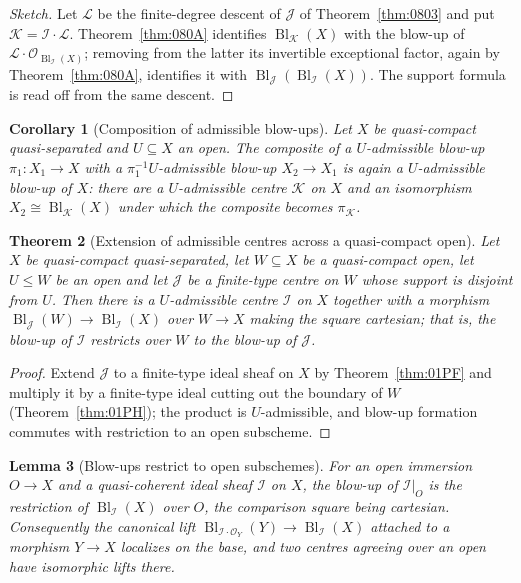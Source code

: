 \documentclass[11pt,a4paper]{article}
\theoremstyle{plain}
\newtheorem{theorem}{Theorem}[section]
\newtheorem{lemma}[theorem]{Lemma}
\newtheorem{corollary}[theorem]{Corollary}
\theoremstyle{definition}
\theoremstyle{remark}
\newcommand{\Bl}{\operatorname{Bl}}
\newcommand{\sO}{\mathcal{O}}
\newcommand{\sI}{\mathcal{I}}
\newcommand{\sJ}{\mathcal{J}}
\newcommand{\sK}{\mathcal{K}}
\newcommand{\sL}{\mathcal{L}}
\newcommand{\qcqs}{quasi-compact quasi-separated}
\begin{document}
\begin{proof}[Sketch]
Let $\sL$ be the finite-degree descent of $\sJ$ of Theorem~\ref{thm:0803} and
put $\sK=\sI\cdot\sL$. Theorem~\ref{thm:080A} identifies $\Bl_\sK(X)$ with the
blow-up of $\sL\cdot\sO_{\Bl_\sI(X)}$; removing from the latter its invertible
exceptional factor, again by Theorem~\ref{thm:080A}, identifies it with
$\Bl_\sJ(\Bl_\sI(X))$. The support formula is read off from the same descent.
\end{proof}

\begin{corollary}[Composition of admissible blow-ups]
\label{cor:080L}
Let $X$ be \qcqs{} and $U\subseteq X$ an open. The composite of a
$U$-admissible blow-up $\pi_1\colon X_1\to X$ with a
$\pi_1^{-1}U$-admissible blow-up $X_2\to X_1$ is again a $U$-admissible
blow-up of $X$: there are a $U$-admissible centre $\sK$ on $X$ and an
isomorphism $X_2\cong\Bl_\sK(X)$ under which the composite becomes $\pi_\sK$.
\end{corollary}

\begin{theorem}[Extension of admissible centres across a quasi-compact open]
\label{thm:080M}
Let $X$ be \qcqs{}, let $W\subseteq X$ be a quasi-compact open, let $U\le W$ be
an open and let $\sJ$ be a finite-type centre on $W$ whose support is disjoint
from $U$. Then there is a $U$-admissible centre $\sI$ on $X$ together with a
morphism $\Bl_\sJ(W)\to\Bl_\sI(X)$ over $W\to X$ making the square cartesian;
that is, the blow-up of $\sI$ restricts over $W$ to the blow-up of $\sJ$.
\end{theorem}

\begin{proof}
Extend $\sJ$ to a finite-type ideal sheaf on $X$ by Theorem~\ref{thm:01PF} and
multiply it by a finite-type ideal cutting out the boundary of $W$
(Theorem~\ref{thm:01PH}); the product is $U$-admissible, and blow-up formation
commutes with restriction to an open subscheme.
\end{proof}

\begin{lemma}[Blow-ups restrict to open subschemes]
\label{lem:blowup-restrict}
For an open immersion $O\to X$ and a quasi-coherent ideal sheaf $\sI$ on $X$,
the blow-up of $\sI|_O$ is the restriction of $\Bl_\sI(X)$ over $O$, the
comparison square being cartesian. Consequently the canonical lift
$\Bl_{\sI\cdot\sO_Y}(Y)\to\Bl_\sI(X)$ attached to a morphism $Y\to X$
localizes on the base, and two centres agreeing over an open have isomorphic
lifts there.
\end{lemma}
\end{document}
